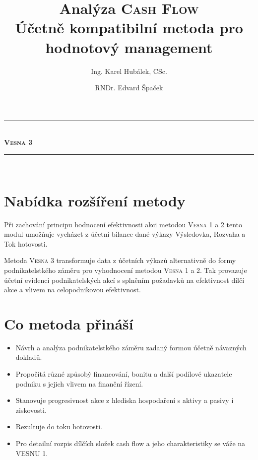 \documentclass [10pt, fancyhdr, twoside] {article}
\begin{document}
\title{Analýza \textsc{Cash Flow} \\
  \large Účetně kompatibilní metoda pro hodnotový management \\
}


\author{
  Ing. Karel Hubálek, CSc.
  \and
  RNDr. Edvard Špaček
}
\date{}


\maketitle

\newcommand\HRule{\rule{\textwidth}{1pt}}

\begin{center}

\HRule \\[0.4cm]
{ \huge \bfseries \textsc{\LARGE Vesna 3}}\\[0.4cm]

\HRule \\[2cm]

\end{center}

\section{Nabídka rozšíření metody}

Při zachování principu hodnocení efektivnosti akci metodou \textsc{Vesna} 1 a 2 tento modul umožňuje vycházet z účetní bilance dané výkazy Výsledovka, Rozvaha a Tok hotovosti.

Metoda \textsc{Vesna} 3 transformuje data z účetních výkazů alternativně do formy podnikatelstkého záměru pro vyhodnocení metodou \textsc{Vesna} 1 a 2. Tak provazuje účetní evidenci podnikatelských akcí s splněním požadavků na efektivnost dílčí akce a vlivem na celopodnikovou efektivnost.


\section{Co metoda přináší}

\begin{itemize}[label=\NibRight]
\item Návrh a analýza podnikatelstkého záměru zadaný formou účetně návazných dokladů.
\item Propočítá různé způsobý financování, bonitu a další podílové ukazatele podniku s jejich vlivem na finanční řízení.
\item Stanovuje progresivnost akce z hlediska hospodaření s aktivy a pasivy i ziskovosti.
\item Rezultuje do toku hotovosti.
\item Pro detailní rozpis dílčích složek cash flow a jeho charakteristiky se váže na VESNU 1.
\end{itemize}
\end{document}
